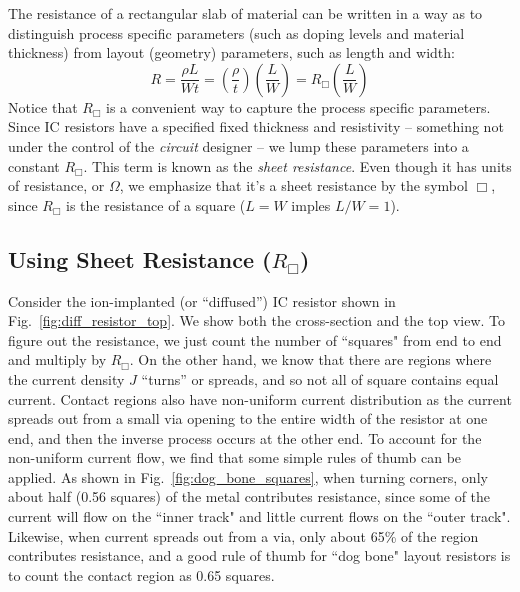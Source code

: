 The resistance of a rectangular slab of material can be written in a way as to distinguish process specific parameters (such as doping levels and material thickness) from layout (geometry) parameters, such as length and width: 
%
\begin{equation} 
	R = \frac{{\rho L}}{{Wt}} = \left( {\frac{\rho }{t}} \right)\left( {\frac{L}{W}} \right) = {R_{\Box}}\left( {\frac{L}{W}} \right)
\end{equation}
%
Notice that $R_{\Box}$ is a convenient way to capture the process specific parameters.  Since  IC resistors have a specified fixed thickness and resistivity – something not under the control of the \textit{circuit} designer – we lump these parameters into a constant $R_{\Box}$.  This term is known as the \textit{sheet resistance}.  Even though it has units of resistance, or $\Omega$, we emphasize that it's a sheet resistance by the symbol $\Box$, since $R_{\Box}$ is the resistance of a square ($L = W$ imples $L/W = 1$).  
 


\subsection{Using Sheet Resistance ($R_\Box$)}

Consider the ion-implanted (or “diffused”) IC resistor shown in Fig.~\ref{fig:diff_resistor_top}.  We show both the cross-section and the top view.  To figure out the resistance, we just count the number of ``squares" from end to end and multiply by $R_\Box$.  On the other hand, we know that there are regions where the current density $J$ ``turns” or spreads, and so not all of square contains equal current.   Contact regions also have non-uniform current distribution as the current spreads out from a small via opening to the entire width of the resistor at one end, and then the inverse process occurs at the other end.  To account for the non-uniform current flow, we find that some simple rules of thumb can be applied.  As shown in Fig.~\ref{fig:dog_bone_squares}, when turning corners, only about half (0.56 squares) of the metal contributes resistance, since some of the current will flow on the ``inner track" and little current flows on the ``outer track".  Likewise, when current spreads out from a via, only about 65\% of the region contributes resistance, and a good rule of thumb for ``dog bone" layout resistors is to count the contact region as 0.65 squares.
 


